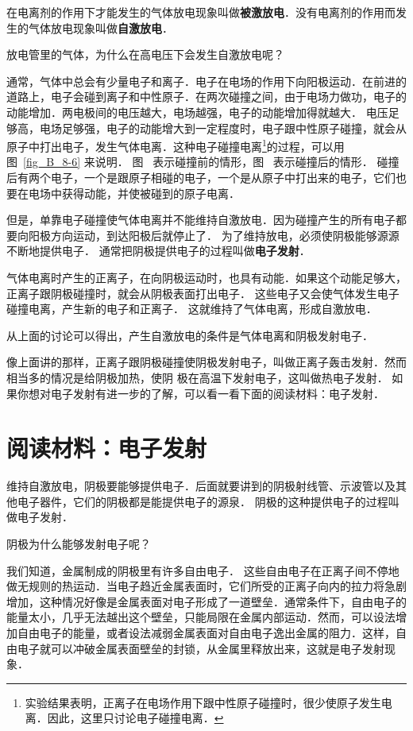 在电离剂的作用下才能发生的气体放电现象叫做\textbf{被激放电}．没有电离剂的作用而发生的气体放电现象叫做\textbf{自激放电}．

放电管里的气体，为什么在高电压下会发生自激放电呢？

通常，气体中总会有少量电子和离子．电子在电场的作用下向阳极运动．在前进的道路上，电子会碰到离子和中性原子．在两次碰撞之间，由于电场力做功，电子的动能增加．两电极间的电压越大，电场越强，电子的动能增加得就越大．
电压足够高，电场足够强，电子的动能增大到一定程度时，电子跟中性原子碰撞，就会从原子中打出电子，发生气体电离．这种电子碰撞电离\footnote{实验结果表明，正离子在电场作用下跟中性原子碰撞时，很少使原子发生电离．因此，这里只讨论电子碰撞电离．}的过程，可以用图~\ref{fig_B_8-6} 来说明．
图~ 表示碰撞前的情形，图~ 表示碰撞后的情形．
碰撞后有两个电子，一个是跟原子相碰的电子，一个是从原子中打出来的电子，它们也要在电场中获得动能，并使被碰到的原子电离．

但是，单靠电子碰撞使气体电离并不能维持自激放电．因为碰撞产生的所有电子都要向阳极方向运动，到达阳极后就停止了．
为了维持放电，必须使阴极能够源源不断地提供电子．
通常把阴极提供电子的过程叫做\textbf{电子发射}．

气体电离时产生的正离子，在向阴极运动时，也具有动能．如果这个动能足够大，正离子跟阴极碰撞时，就会从阴极表面打出电子．
这些电子又会使气体发生电子碰撞电离，产生新的电子和正离子．
这就维持了气体电离，形成自激放电．

从上面的讨论可以得出，产生自激放电的条件是气体电离和阴极发射电子．

像上面讲的那样，正离子跟阴极碰撞使阴极发射电子，叫做正离子轰击发射．然而相当多的情况是给阴极加热，使阴
极在高温下发射电子，这叫做热电子发射．
如果你想对电子发射有进一步的了解，可以看一看下面的阅读材料：电子发射．


\section*{阅读材料：电子发射}
维持自激放电，阴极要能够提供电子．后面就要讲到的阴极射线管、示波管以及其他电子器件，它们的阴极都是能提供电子的源泉．
阴极的这种提供电子的过程叫做电子发射．

阴极为什么能够发射电子呢？

我们知道，金属制成的阴极里有许多自由电子．
这些自由电子在正离子间不停地做无规则的热运动．当电子趋近金属表面时，它们所受的正离子向内的拉力将急剧增加，这种情况好像是金属表面对电子形成了一道壁垒．通常条件下，自由电子的能量太小，几乎无法越出这个壁垒，只能局限在金属内部运动．然而，可以设法增加自由电子的能量，或者设法减弱金属表面对自由电子逸出金属的阻力．这样，自由电子就可以冲破金属表面壁垒的封锁，从金属里释放出来，这就是电子发射现象．

